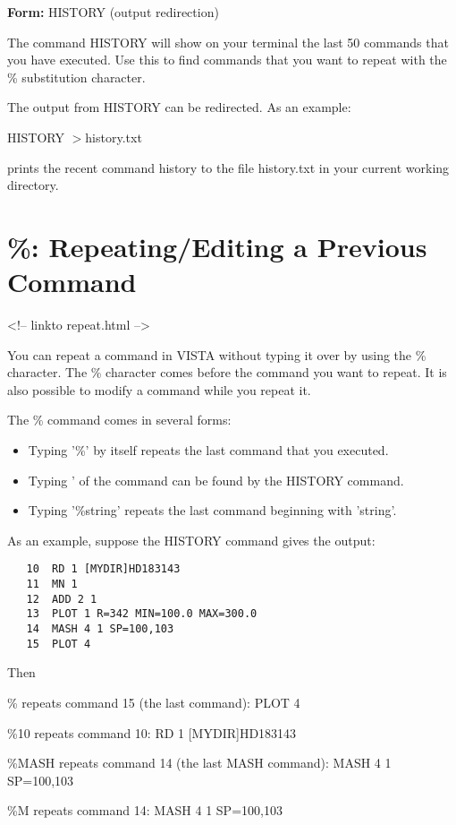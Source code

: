 \begin{command}
  \item[\textbf{Form: }HISTORY (output redirection)]{}
\end{command}

The command HISTORY will show on your terminal the last 50 commands that
you have executed.  Use this to find commands that you want to repeat with
the \% substitution character.

The output from HISTORY can be redirected.  As an example:
\begin{hanging}
  \item{HISTORY $>$history.txt}
\end{hanging}
prints the recent command history to the file history.txt in your
current working directory.

\section{\%: Repeating/Editing a Previous Command}
\begin{rawhtml}
<!-- linkto repeat.html -->
\end{rawhtml}

You can repeat a command in VISTA without typing it over by using the \%
character.  The \% character comes before the command you want to repeat.
It is also possible to modify a command while you repeat it.

The \% command comes in several forms:
\begin{itemize}
  \item{Typing '\%' by itself repeats the last command that you executed. }

  \item{Typing '%
   of the command can be found by the HISTORY command.}

  \item{Typing '\%string' repeats the last command beginning with 'string'.}
\end{itemize}

As an example, suppose the HISTORY command gives the output:
\begin{verbatim}
   10  RD 1 [MYDIR]HD183143
   11  MN 1
   12  ADD 2 1
   13  PLOT 1 R=342 MIN=100.0 MAX=300.0
   14  MASH 4 1 SP=100,103
   15  PLOT 4
\end{verbatim}
Then
\begin{example}
   \item[\%\hfill]{repeats command 15 (the last command):  PLOT 4}
   \item[\%10\hfill]{repeats command 10:  RD 1 [MYDIR]HD183143}
   \item[\%MASH \hfill]{repeats command 14 (the last MASH command): 
       MASH 4 1 SP=100,103}
   \item[\%M\hfill]{repeats command 14:  MASH 4 1 SP=100,103}
\end{example}

